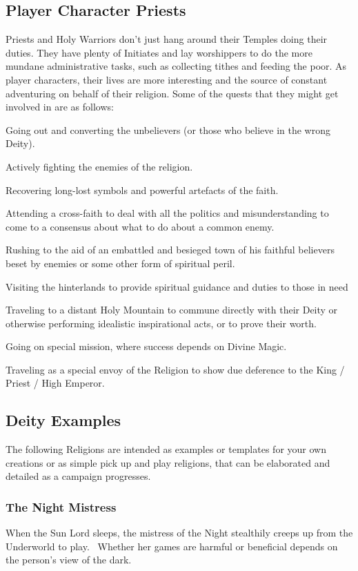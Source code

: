 \subsection{Player Character Priests}
Priests and Holy Warriors don’t just hang around their Temples doing their duties. They have plenty of Initiates and lay worshippers to do the more mundane administrative tasks, such as collecting tithes and feeding the poor. As player characters, their lives are more interesting and the source of constant adventuring on behalf of their religion. Some of the quests that they might get involved in are as follows:
\begin{rpg-list}
\item Going out and converting the unbelievers (or those who believe in the wrong Deity).
\item Actively fighting the enemies of the religion.
\item Recovering long-lost symbols and powerful artefacts of the faith. 
\item Attending a cross-faith to deal with all the politics and misunderstanding to come to a consensus about what to do about a common enemy.
\item Rushing to the aid of an embattled and besieged town of his faithful believers beset by enemies or some other form of spiritual peril.
\item Visiting the hinterlands to provide spiritual guidance and duties to those in need
\item Traveling to a distant Holy Mountain to commune directly with their Deity or otherwise performing idealistic inspirational acts, or to prove their worth.
\item Going on special mission, where success depends on Divine Magic.
\item Traveling as a special envoy of the Religion to show due deference to the King / Priest / High Emperor.
\end{rpg-list}


\subsection{Deity Examples}
\label{ssec:deities}
The following Religions are intended as examples or templates for your own creations or as simple pick up and play religions, that can be elaborated and detailed as a campaign progresses.

\subsubsection{The Night Mistress}
When the Sun Lord sleeps, the mistress of the Night stealthily creeps up from the Underworld to play.  Whether her games are harmful or beneficial depends on the person's view of the dark.


